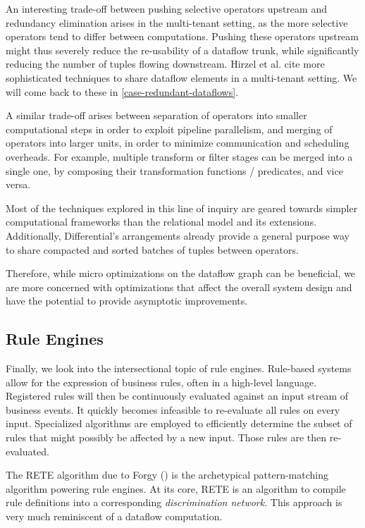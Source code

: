 \documentclass[../index.tex]{subfiles}
\begin{document}
An interesting trade-off between pushing selective operators upstream
and redundancy elimination arises in the multi-tenant setting, as the
more selective operators tend to differ between computations. Pushing
these operators upstream might thus severely reduce the re-usability
of a dataflow trunk, while significantly reducing the number of tuples
flowing downstream. Hirzel et al. cite more sophisticated techniques
to share dataflow elements in a multi-tenant setting. We will come
back to these in \autoref{case-redundant-dataflows}.

A similar trade-off arises between separation of operators into
smaller computational steps in order to exploit pipeline parallelism,
and merging of operators into larger units, in order to minimize
communication and scheduling overheads. For example, multiple
transform or filter stages can be merged into a single one, by
composing their transformation functions / predicates, and vice versa.

Most of the techniques explored in this line of inquiry are geared
towards simpler computational frameworks than the relational model and
its extensions. Additionally, Differential's arrangements already
provide a general purpose way to share compacted and sorted batches of
tuples between operators.

Therefore, while micro optimizations on the dataflow graph can be
beneficial, we are more concerned with optimizations that affect the
overall system design and have the potential to provide asymptotic
improvements.

\subsection{Rule Engines}

Finally, we look into the intersectional topic of rule
engines. Rule-based systems allow for the expression of business
rules, often in a high-level language. Registered rules will then be
continuously evaluated against an input stream of business events. It
quickly becomes infeasible to re-evaluate all rules on every
input. Specialized algorithms are employed to efficiently determine
the subset of rules that might possibly be affected by a new
input. Those rules are then re-evaluated.

The RETE algorithm due to Forgy (\cite{forgy1989rete}) is the
archetypical pattern-matching algorithm powering rule engines. At its
core, RETE is an algorithm to compile rule definitions into a
corresponding \emph{discrimination network}. This approach is very
much reminiscent of a dataflow computation.
\end{document}
